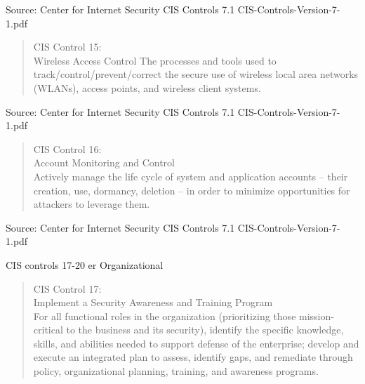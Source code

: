 \documentclass[Screen16to9,17pt]{foils}
\begin{document}
\begin{list1}
\item
\item
\item
\item
\end{list1}

Source: Center for Internet Security CIS Controls 7.1 CIS-Controls-Version-7-1.pdf


\begin{quote}
CIS Control 15:\\
Wireless Access Control
The processes and tools used to track/control/prevent/correct the secure use of wireless local area networks (WLANs), access points, and wireless client systems.
\end{quote}

\begin{list1}
\item
\item
\item
\item
\end{list1}

Source: Center for Internet Security CIS Controls 7.1 CIS-Controls-Version-7-1.pdf


\begin{quote}
CIS Control 16:\\
Account Monitoring and Control\\
Actively manage the life cycle of system and application accounts – their creation, use, dormancy, deletion – in order to minimize opportunities for attackers to leverage them.
\end{quote}

\begin{list1}
\item
\item
\item
\item
\end{list1}

Source: Center for Internet Security CIS Controls 7.1 CIS-Controls-Version-7-1.pdf


CIS controls 17-20 er Organizational

\begin{quote}
CIS Control 17:\\
Implement a Security Awareness and Training Program\\
For all functional roles in the organization (prioritizing those mission-critical to the business and its security), identify the specific knowledge, skills, and abilities needed to support defense of the enterprise; develop and execute an integrated plan to assess, identify gaps, and remediate through policy, organizational planning, training, and awareness programs.
\end{quote}
\end{document}
